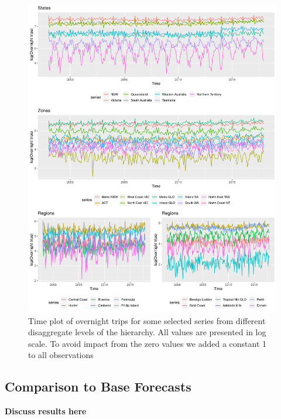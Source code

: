 \documentclass[12pt]{article}
\theoremstyle{definition}
\theoremstyle{property}
\begin{document}
\begin{figure}
		\centering
		\small
		\includegraphics[width= \textwidth]{Empirical-results/TS-plots/States_Zones_Regs_TSplots1.pdf}
		\caption{Time plot of overnight trips for some selected series from different disaggregate levels of the hierarchy. All values are presented in log scale. To avoid impact from the zero values we added a constant 1 to all observations}\label{fig:States_Zones_Regs_TSplots}
\end{figure}

\clearpage

    \subsection{Comparison to Base Forecasts}\label{sec:comparebase}
    
    {\bf Discuss results here}
    
\end{document}
